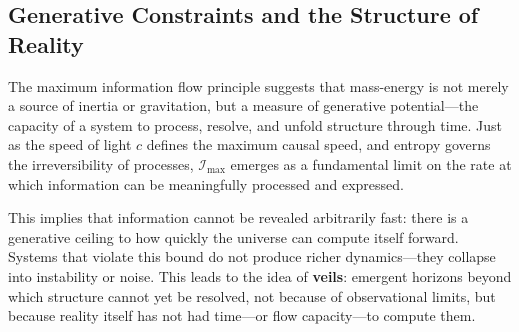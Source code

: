\documentclass[12pt]{article}
\begin{document}


\subsection{Generative Constraints and the Structure of Reality}

The maximum information flow principle suggests that mass-energy is not merely a source of inertia or gravitation, but a measure of generative potential—the capacity of a system to process, resolve, and unfold structure through time. Just as the speed of light \( c \) defines the maximum causal speed, and entropy governs the irreversibility of processes, \( \mathcal{I}_{\text{max}} \) emerges as a fundamental limit on the rate at which information can be meaningfully processed and expressed.

This implies that information cannot be revealed arbitrarily fast: there is a generative ceiling to how quickly the universe can compute itself forward. Systems that violate this bound do not produce richer dynamics—they collapse into instability or noise. This leads to the idea of \textbf{veils}: emergent horizons beyond which structure cannot yet be resolved, not because of observational limits, but because reality itself has not had time—or flow capacity—to compute them.
\end{document}
